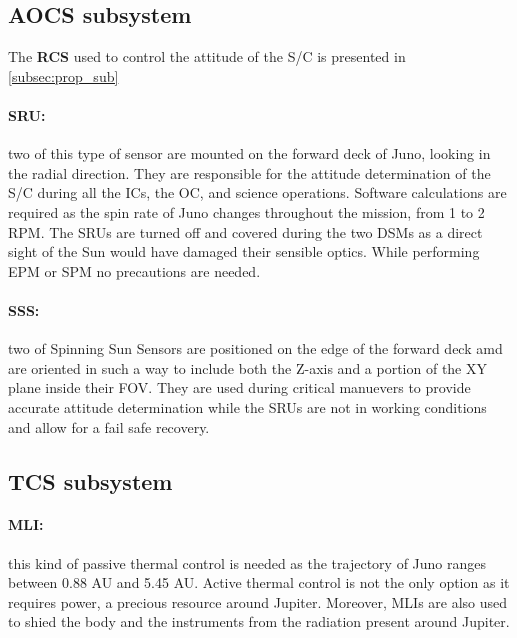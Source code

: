 \subsection{AOCS subsystem}
\label{subsec:aocs_sub}

The \textbf{RCS} used to control the attitude of the S/C is presented in \autoref{subsec:prop_sub}

\vspace{-4mm}

\paragraph{SRU:}two of this type of sensor are mounted on the forward deck of Juno, looking in the radial direction. They are responsible for the attitude determination of the S/C during all the ICs, the OC, and science operations. Software calculations are required as the spin rate of Juno changes throughout the mission, from 1 to 2 RPM. The SRUs are turned off and covered during the two DSMs as a direct sight of the Sun would have damaged their sensible optics. While performing EPM or SPM no precautions are needed. 

\vspace{-4mm}

\paragraph{SSS:}two of Spinning Sun Sensors are positioned on the edge of the forward deck amd are oriented in such a way to include both the Z-axis and a portion of the XY plane inside their FOV. They are used during critical manuevers to provide accurate attitude determination while the SRUs are not in working conditions and allow for a fail safe recovery. 

\subsection{TCS subsystem}
\label{subsec:tcs_sub}

\paragraph{MLI:}this kind of passive thermal control is needed as the trajectory of Juno ranges between 0.88 AU and 5.45 AU. Active thermal control is not the only option as it requires power, a precious resource around Jupiter. Moreover, MLIs are also used to shied the body and the instruments from the radiation present around Jupiter. 

